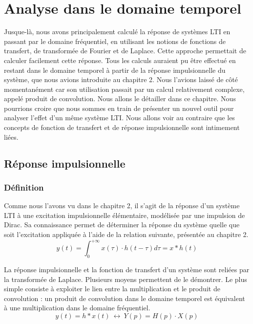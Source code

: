 \chapter{Analyse dans le domaine temporel}
\label{chap:temporel}
	Jusque-là, nous avons principalement calculé la réponse de systèmes LTI en passant par le domaine fréquentiel, en utilisant les notions de fonctions de transfert, de transformée de Fourier et de Laplace. Cette approche permettait de calculer facilement cette réponse.
	Tous les calculs auraient pu être effectué en restant dans le domaine temporel à partir de la réponse impulsionnelle du système, que nous avions introduite au chapitre 2. Nous l'avions laissé de côté momentanément car son utilisation passait par un calcul relativement complexe, appelé produit de convolution. Nous allons le détailler dans ce chapitre.
	Nous pourrions croire que nous sommes en train de présenter un nouvel outil pour analyser l'effet d'un même système LTI. Nous allons voir au contraire que les concepts de fonction de transfert et de réponse impulsionnelle sont intimement liées.
	
	
	\section{Réponse impulsionnelle}
	
	\subsection{Définition}
	
	Comme nous l'avons vu dans le chapitre 2, il s'agit de la réponse d'un système LTI à une excitation impulsionnelle élémentaire, modélisée par une impulsion de Dirac. Sa connaissance permet de déterminer la réponse du système quelle que soit l'excitation appliquée à l'aide de la relation suivante, présentée au chapitre 2.
	\begin{equation}\label{Calcul_reponse_temporel_causal}
	y(t) = \int_{0}^{+ \infty} x(\tau) \cdot h(t-\tau)d\tau = x*h(t)
	\end{equation}
	\vspace{1\baselineskip}
	
	La réponse impulsionnelle et la fonction de transfert d'un système sont reliées par la transformée de Laplace. Plusieurs moyens permettent de le démontrer. Le plus simple consiste à exploiter le lien entre la multiplication et le produit de convolution : un produit de convolution dans le domaine temporel est équivalent à une multiplication dans le domaine fréquentiel.
	\begin{equation}\label{}
	y(t) =  h*x(t) ~\longleftrightarrow~Y(p)=H(p)\cdot X(p)
	\end{equation}
	
